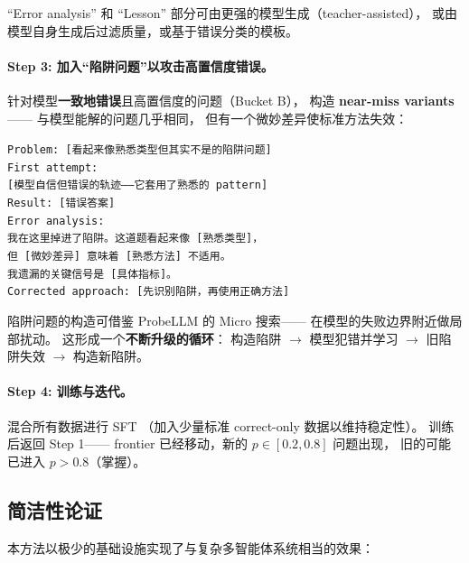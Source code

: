 \documentclass[12pt,a4paper]{article}
\begin{document}
\noindent
``Error analysis'' 和 ``Lesson'' 部分可由更强的模型生成（teacher-assisted），
或由模型自身生成后过滤质量，或基于错误分类的模板。

\paragraph{Step 3: 加入``陷阱问题''以攻击高置信度错误。}

针对模型\textbf{一致地错误}且高置信度的问题（Bucket B），
构造 \textbf{near-miss variants}——
与模型能解的问题几乎相同，
但有一个微妙差异使标准方法失效：

\begin{tcolorbox}[colback=gray!5,colframe=gray!50,boxrule=0.3pt,left=4pt,right=4pt]
\small
\texttt{Problem: [看起来像熟悉类型但其实不是的陷阱问题]}\\[3pt]
\texttt{First attempt:}\\
\texttt{[模型自信但错误的轨迹——它套用了熟悉的 pattern]}\\
\texttt{Result: [错误答案]}\\[3pt]
\texttt{Error analysis:}\\
\texttt{我在这里掉进了陷阱。这道题看起来像 [熟悉类型]，}\\
\texttt{但 [微妙差异] 意味着 [熟悉方法] 不适用。}\\
\texttt{我遗漏的关键信号是 [具体指标]。}\\[3pt]
\texttt{Corrected approach: [先识别陷阱，再使用正确方法]}
\end{tcolorbox}

\noindent
陷阱问题的构造可借鉴 ProbeLLM 的 Micro 搜索——
在模型的失败边界附近做局部扰动。
这形成一个\textbf{不断升级的循环}：
构造陷阱 $\rightarrow$ 模型犯错并学习 $\rightarrow$
旧陷阱失效 $\rightarrow$ 构造新陷阱。

\paragraph{Step 4: 训练与迭代。}
混合所有数据进行 SFT
（加入少量标准 correct-only 数据以维持稳定性）。
训练后返回 Step 1——
frontier 已经移动，新的 $p \in [0.2, 0.8]$ 问题出现，
旧的可能已进入 $p > 0.8$（掌握）。

\subsection{简洁性论证}

本方法以极少的基础设施实现了与复杂多智能体系统相当的效果：
\end{document}

